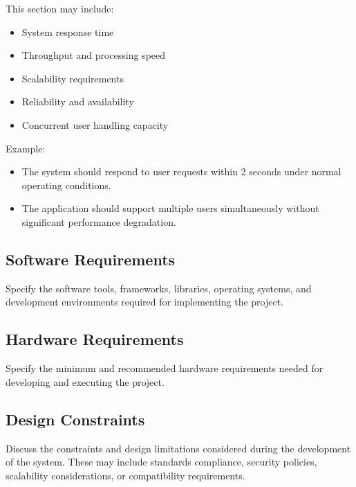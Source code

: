This section may include:
\begin{itemize}
    \item System response time
    \item Throughput and processing speed
    \item Scalability requirements
    \item Reliability and availability
    \item Concurrent user handling capacity
\end{itemize}

Example:
\begin{itemize}
    \item The system should respond to user requests within 2 seconds under normal operating conditions.
    
    \item The application should support multiple users simultaneously without significant performance degradation.
\end{itemize}


\subsection{Software Requirements}

Specify the software tools, frameworks, libraries, operating systems, and development environments required for implementing the project.


\subsection{Hardware Requirements}

Specify the minimum and recommended hardware requirements needed for developing and executing the project.



\subsection{Design Constraints}

Discuss the constraints and design limitations considered during the development of the system. These may include standards compliance, security policies, scalability considerations, or compatibility requirements.

